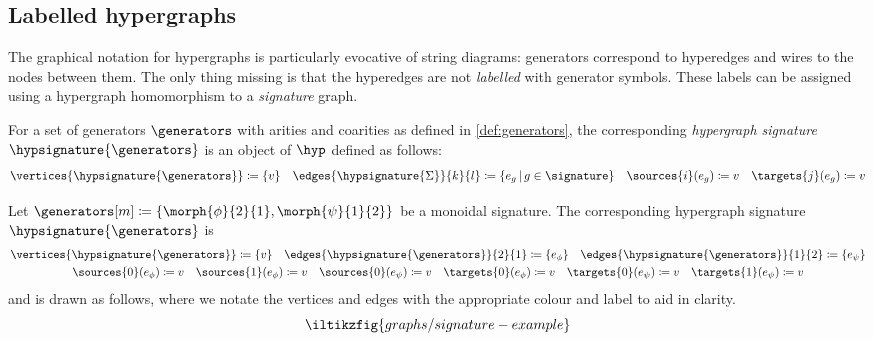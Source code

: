 \subsection{Labelled hypergraphs}

The graphical notation for hypergraphs is particularly evocative of string
diagrams: generators
correspond to hyperedges and wires to the nodes between them.
The only thing missing is that the hyperedges are not \emph{labelled} with
generator symbols.
These labels can be assigned using a hypergraph homomorphism to a
\emph{signature} graph.


\begin{definition}
    For a set of generators \(\generators\) with arities and coarities as defined
    in \cref{def:generators}, the corresponding \emph{hypergraph signature}
    \(\hypsignature{\generators}\) is an object of \(\hyp\) defined as follows:
    \begin{gather*}
        \vertices{\hypsignature{\generators}}
        \coloneqq
        \{ v \}
        \quad
        \edges{\hypsignature{\Sigma}}{k}{l}
        \coloneqq
        \{ e_g \,|\, g \in \signature\}
        \quad
        \sources{i}(e_g) \coloneqq v
        \quad
        \targets{j}(e_g) \coloneqq v
    \end{gather*}
\end{definition}

\begin{example}\label{ex:labelled-hypergraph-signature}
    Let \(\generators[m] \coloneqq \{\morph{\phi}{2}{1}, \morph{\psi}{1}{2}\}\)
    be a monoidal signature.
    The corresponding hypergraph signature \(\hypsignature{\generators}\) is
    \begin{gather*}
        \vertices{\hypsignature{\generators}} \coloneqq \{v\}
        \quad
        \edges{\hypsignature{\generators}}{2}{1} \coloneqq \{e_\phi\}
        \quad
        \edges{\hypsignature{\generators}}{1}{2} \coloneqq \{e_\psi\}
        \\
        \sources{0}(e_\phi) \coloneqq v
        \quad
        \sources{1}(e_\phi) \coloneqq v
        \quad
        \sources{0}(e_\psi) \coloneqq v
        \quad
        \targets{0}(e_\phi) \coloneqq v
        \quad
        \targets{0}(e_\psi) \coloneqq v
        \quad
        \targets{1}(e_\psi) \coloneqq v
    \end{gather*}
    and is drawn as follows, where we notate the vertices and edges with the
    appropriate colour and label to aid in clarity.
    \[
        \iltikzfig{graphs/signature-example}
    \]
\end{example}

